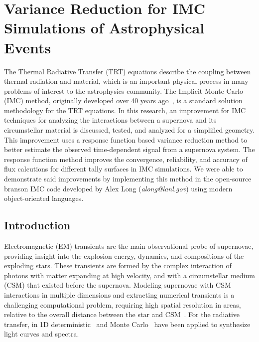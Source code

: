 \chapter{Variance Reduction for IMC Simulations of Astrophysical Events}


\begin{chapabstract}
	The Thermal Radiative Transfer (TRT) equations describe the coupling between thermal radiation and material, which is an important physical process in many problems of interest to the astrophysics community. The Implicit Monte Carlo (IMC) method, originally developed over 40 years ago~\cite{FC71}, is a standard solution methodology for the TRT equations. In this research, an improvement for IMC techniques for analyzing the interactions between a supernova and its circumstellar material is discussed, tested, and analyzed for a simplified geometry. This improvement uses a response function based variance reduction method to better estimate the observed time-dependent signal from a supernova system. The response function method improves the convergence, reliability, and accuracy of flux calcutions for different tally surfaces in IMC simulations. We were able to demonstrate said improvements by implementing this method in the open-source branson IMC code developed by Alex Long (\textit{along@lanl.gov}) using modern object-oriented languages.
\end{chapabstract}

\section{Introduction}
Electromagnetic (EM) transients are the main observational probe of supernovae, providing insight into the explosion energy, dynamics, and compositions of the exploding stars. These transients are formed by the complex interaction of photons with matter expanding at high velocity, and with a circumstellar medium (CSM) that existed before the supernova. Modeling supernovae with CSM interactions in multiple dimensions and extracting numerical transients is a challenging computational problem, requiring high spatial resolution in areas, relative to the overall distance between the star and CSM~\cite{MS10,MB13}. For the radiative transfer, in 1D deterministic~\cite{MB13} and Monte Carlo~\cite{KW09} have been applied to synthesize light curves and spectra.

